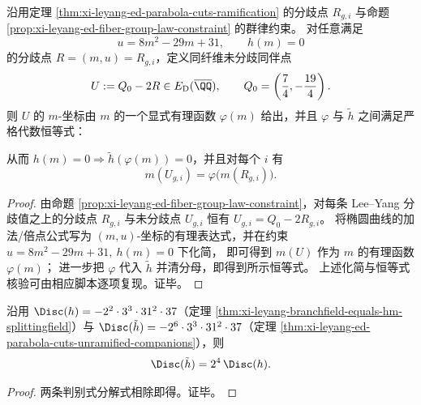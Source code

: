 \begin{theorem}\label{thm:xi-leyang-ed-double-translate-varphi-h-to-htilde}
沿用定理 \ref{thm:xi-leyang-ed-parabola-cuts-ramification} 的分歧点 \(R_{g,i}\) 与命题 \ref{prop:xi-leyang-ed-fiber-group-law-constraint} 的群律约束。
对任意满足
\[
u=8m^2-29m+31,\qquad h(m)=0
\]
的分歧点 \(R=(m,u)=R_{g,i}\)，定义同纤维未分歧同伴点
\[
U:=Q_0-2R\in E_{\mathrm D}(\overline\QQ),
\qquad
Q_0=\left(\frac74,-\frac{19}{4}\right).
\]
则 \(U\) 的 \(m\)-坐标由 \(m\) 的一个显式有理函数 \(\varphi(m)\) 给出，并且 \(\varphi\) 与 \(\tilde h\) 之间满足严格代数恒等式：

从而 \(h(m)=0\Rightarrow \tilde h(\varphi(m))=0\)，并且对每个 \(i\) 有
\[
m(U_{g,i})=\varphi\bigl(m(R_{g,i})\bigr).
\]
\end{theorem}
\begin{proof}
由命题 \ref{prop:xi-leyang-ed-fiber-group-law-constraint}，对每条 Lee--Yang 分歧值之上的分歧点 \(R_{g,i}\) 与未分歧点 \(U_{g,i}\) 恒有
\(
U_{g,i}=Q_0-2R_{g,i}
\)。
将椭圆曲线的加法/倍点公式写为 \((m,u)\)-坐标的有理表达式，并在约束 \(u=8m^2-29m+31,\ h(m)=0\) 下化简，
即可得到 \(m(U)\) 作为 \(m\) 的有理函数 \(\varphi(m)\)；
进一步把 \(\varphi\) 代入 \(\tilde h\) 并清分母，即得到所示恒等式。
上述化简与恒等式核验可由相应脚本逐项复现。证毕。
\end{proof}

\begin{corollary}\label{cor:xi-leyang-ed-disc-tildeh-vs-h}
沿用 \(\Disc(h)=-2^{2}\cdot 3^{3}\cdot 31^{2}\cdot 37\)（定理 \ref{thm:xi-leyang-branchfield-equals-hm-splittingfield}）与
\(\Disc(\tilde h)=-2^{6}\cdot 3^{3}\cdot 31^{2}\cdot 37\)（定理 \ref{thm:xi-leyang-ed-parabola-cuts-unramified-companions}），则
\[
\Disc(\tilde h)=2^{4}\,\Disc(h).
\]
\end{corollary}
\begin{proof}
两条判别式分解式相除即得。证毕。
\end{proof}


